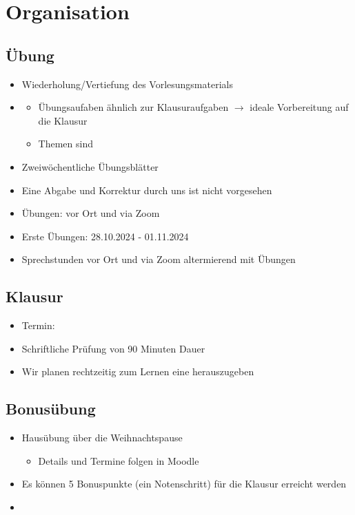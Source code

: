 \section{Organisation}
\subsection{Übung}
\begin{itemize}
    \item {} Wiederholung/Vertiefung des Vorlesungsmaterials
    \item {}
    \begin{itemize}
        \item Übungsaufaben ähnlich zur Klausuraufgaben $\rightarrow$ ideale Vorbereitung auf die Klausur
        \item Themen sind 
    \end{itemize}
    \item Zweiwöchentliche Übungsblätter
    \item Eine Abgabe und Korrektur durch uns ist nicht vorgesehen
    \item Übungen: vor Ort und via Zoom
    \item Erste Übungen: 28.10.2024 - 01.11.2024
    \item Sprechstunden vor Ort und via Zoom altermierend mit Übungen
\end{itemize}
\subsection{Klausur}
\begin{itemize}
    \item Termin: 
    \item Schriftliche Prüfung von 90 Minuten Dauer
    \item Wir planen rechtzeitig zum Lernen eine  herauszugeben
\end{itemize}
\subsection{Bonusübung}
\begin{itemize}
    \item {} Hausübung über die Weihnachtspause
    \begin{itemize}
        \item Details und Termine folgen in Moodle
    \end{itemize}
    \item Es können 5 Bonuspunkte (ein Notenschritt) für die Klausur erreicht werden
    \item {}
\end{itemize}
